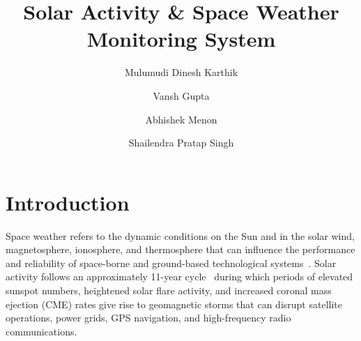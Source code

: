 


\title{Solar Activity \& Space Weather Monitoring System}

\author{
    \small Mulumudi Dinesh Karthik \and
    \small Vansh Gupta \and
    \small Abhishek Menon \and
    \small Shailendra Pratap Singh
    }





\maketitle




\section{Introduction}

Space weather refers to the dynamic conditions on the Sun and in the solar wind, magnetosphere, ionosphere, and thermosphere that can influence the performance and reliability of space-borne and ground-based technological systems~\citep{pulkkinen_space_weather_2007}. Solar activity follows an approximately 11-year cycle~\citep{hathaway_solar_2015} during which periods of elevated sunspot numbers, heightened solar flare activity, and increased coronal mass ejection (CME) rates give rise to geomagnetic storms that can disrupt satellite operations, power grids, GPS navigation, and high-frequency radio communications.

